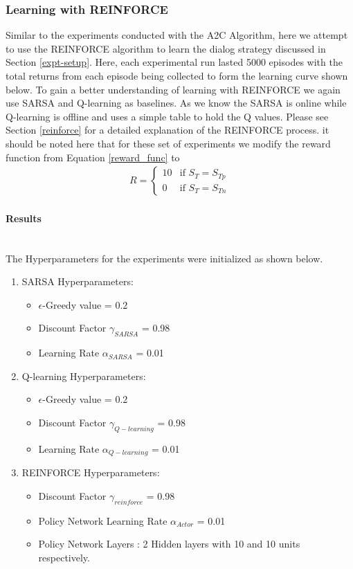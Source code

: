 \documentclass[12pt]{extarticle}
\newcommand{\myparagraph}[1]{\paragraph{#1}\mbox{}\\ \linebreak}
\numberwithin{equation}{section}
\begin{document}
	\subsubsection{Learning with REINFORCE}
	Similar to the experiments conducted with the A2C Algorithm, here we attempt to use the REINFORCE algorithm to learn the dialog strategy discussed in Section \ref{expt-setup}. Here, each experimental run lasted 5000 episodes with the total returns from each episode being collected to form the learning curve shown below. To gain a better understanding of learning with REINFORCE we again use SARSA and Q-learning\cite{Sutton-introRL} as baselines. As we know the SARSA is online while Q-learning is offline and uses a simple table to hold the Q values. Please see Section \ref{reinforce} for a detailed explanation of the REINFORCE process. it should be noted here that for these set of experiments we modify the reward function from Equation \ref{reward_func} to 
	\begin{align}
	R = \begin{cases}
	10 & \text{if }S_T = S_{Tp} \\    
	0 & \text{if }S_T = S_{Tn}
	\end{cases}\label{reward_func_10}
	\end{align}
	\myparagraph{Results}\label{reinf_pre_results}
	The Hyperparameters for the experiments were initialized as shown below.
	\begin{enumerate}
		\item SARSA Hyperparameters:
		\begin{itemize}
			\item $\epsilon$-Greedy value = 0.2
			\item Discount Factor $\gamma_{SARSA}$ = 0.98
			\item Learning Rate $\alpha_{SARSA}$ = 0.01
		\end{itemize}
		\item Q-learning Hyperparameters:
		\begin{itemize}
			\item $\epsilon$-Greedy value = 0.2
			\item Discount Factor $\gamma_{Q-learning}$ = 0.98
			\item Learning Rate $\alpha_{Q-learning}$ = 0.01
		\end{itemize}
		\item REINFORCE Hyperparameters:
		\begin{itemize}
			\item Discount Factor $\gamma_{reinforce}$ = 0.98
			\item Policy Network Learning Rate $\alpha_{Actor}$ = 0.01
			\item Policy Network Layers : 2 Hidden layers with 10 and 10 units respectively.
		\end{itemize}
	\end{enumerate}
\end{document}
